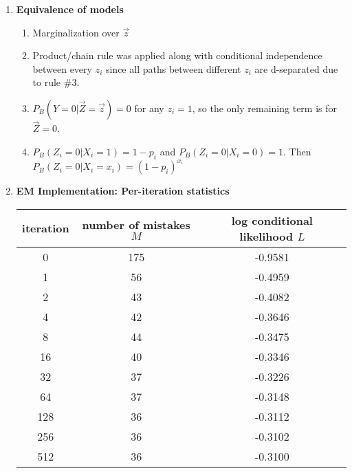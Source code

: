 \documentclass[11]{article}
\begin{document}
\begin{enumerate}[label=(\alph*)]
\item{\textbf{Equivalence of models}}
\begin{enumerate}[label=(\roman*)]
\item
Marginalization over $\overrightarrow{z}$

\item
Product/chain rule was applied along with conditional independence between every $z_i$ since all paths between different $z_i$ are d-separated due to rule \#3.

\item
$P_B(Y=0|\overrightarrow{Z}=\overrightarrow{z})=0$ for any $z_i=1$, so the only remaining term is for $\overrightarrow{Z}=0$.

\item
$P_B(Z_i=0|X_i=1)=1-p_i$ and $P_B(Z_i=0|X_i=0)=1$. Then $P_B(Z_i=0|X_i=x_i)=(1-p_i)^{x_i}$
\end{enumerate}

\item{\textbf{EM Implementation: Per-iteration statistics}}
\begin{center}
\centering
\begin{tabular}{|c|c|c|}
\hline
\textbf{iteration} & \textbf{number of mistakes $M$} & \textbf{log conditional likelihood $L$} \\ \hline
0                  & 175                             & -0.9581                                 \\ \hline
1                  & 56                              & -0.4959                                 \\ \hline
2                  & 43                              & -0.4082                                 \\ \hline
4                  & 42                              & -0.3646                                 \\ \hline
8                  & 44                              & -0.3475                                 \\ \hline
16                 & 40                              & -0.3346                                 \\ \hline
32                 & 37                              & -0.3226                                 \\ \hline
64                 & 37                              & -0.3148                                 \\ \hline
128                & 36                              & -0.3112                                 \\ \hline
256                & 36                              & -0.3102                                 \\ \hline
512                & 36                              & -0.3100                                 \\ \hline
\end{tabular}
\end{center}


\end{enumerate}
\end{document}
